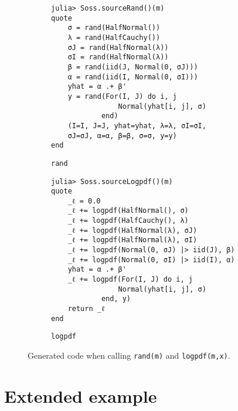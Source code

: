\documentclass[anonymous=false, %
               format=acmsmall, %
               review=true, %
               screen=true, %
               nonacm=true]{acmart}
\begin{document}
\begin{figure}[t]
\centering
\begin{subfigure}[t]{0.48\textwidth}
\begin{verbatim}
julia> Soss.sourceRand()(m)
quote
    σ = rand(HalfNormal())
    λ = rand(HalfCauchy())
    σJ = rand(HalfNormal(λ))
    σI = rand(HalfNormal(λ))
    β = rand(iid(J, Normal(0, σJ)))
    α = rand(iid(I, Normal(0, σI)))
    yhat = α .+ β'
    y = rand(For(I, J) do i, j
                Normal(yhat[i, j], σ)
            end)
    (I=I, J=J, yhat=yhat, λ=λ, σI=σI, 
    σJ=σJ, α=α, β=β, σ=σ, y=y) 
end
\end{verbatim}
\caption{\footnotesize{\texttt{rand}}}
\end{subfigure}
\begin{subfigure}[t]{0.48\textwidth}
\begin{verbatim}
julia> Soss.sourceLogpdf()(m)
quote
    _ℓ = 0.0
    _ℓ += logpdf(HalfNormal(), σ)
    _ℓ += logpdf(HalfCauchy(), λ)
    _ℓ += logpdf(HalfNormal(λ), σJ)
    _ℓ += logpdf(HalfNormal(λ), σI)
    _ℓ += logpdf(Normal(0, σJ) |> iid(J), β)
    _ℓ += logpdf(Normal(0, σI) |> iid(I), α)
    yhat = α .+ β'
    _ℓ += logpdf(For(I, J) do i, j
                Normal(yhat[i, j], σ)
            end, y)
    return _ℓ
end
\end{verbatim}
\caption{\footnotesize{\texttt{logpdf}}}
\end{subfigure}
\caption{Generated code when calling \footnotesize{\texttt{rand(m)}} and \footnotesize{\texttt{logpdf(m,x)}}.} 
\label{} 
\end{figure}




\section{Extended example }
\end{document}
